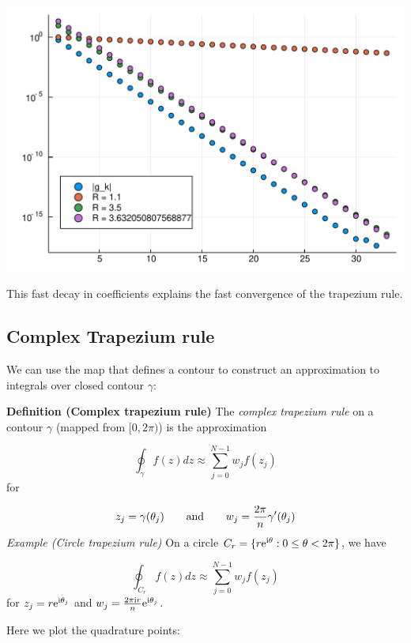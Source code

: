 \documentclass[12pt,a4paper]{article}
\def\I{ {\rm i} }
\def\E{ {\rm e} }
\begin{document}
\includegraphics[width=\linewidth]{figures/Lecture6_3_1.pdf}

This fast decay in coefficients explains the fast convergence of the trapezium rule.

\subsection{Complex Trapezium rule}
We can use the map that defines a contour to construct an approximation to integrals over closed contour $\gamma$:

\textbf{Definition (Complex trapezium rule)} The \emph{complex trapezium rule} on a contour $\gamma$ (mapped from $[0,2\pi)$) is the approximation

\[
\oint_\gamma f(z) dz \approx  \sum_{j=0}^{N-1} w_j f(z_j)
\]
for

\[
z_j = \gamma(\theta_j) \qquad\hbox{and}\qquad w_j = {2\pi \over n} \gamma'(\theta_j)
\]
\emph{Example (Circle trapezium rule)} On a circle $C_r = \{r \E^{\I \theta} : 0 \leq \theta < 2 \pi\}$, we have 

\[
\oint_{C_r} f(z) dz \approx  \sum_{j=0}^{N-1} w_j f(z_j)
\]
for $z_j = r \E^{\I \theta_j}$ and $w_j = {2 \pi \I r \over n}  \E^{\I \theta_j}$.

Here we plot the quadrature points:
\end{document}
